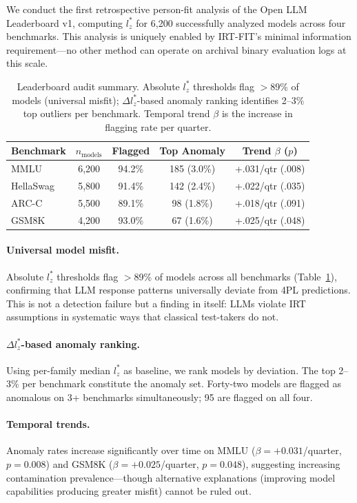 \documentclass[11pt,a4paper]{article}
\begin{document}
We conduct the first retrospective person-fit analysis of the Open LLM Leaderboard v1, computing $l_z^*$ for 6{,}200 successfully analyzed models across four benchmarks. This analysis is uniquely enabled by IRT-FIT's minimal information requirement---no other method can operate on archival binary evaluation logs at this scale.

\begin{table}[t]
\centering
\small
\caption{Leaderboard audit summary. Absolute $l_z^*$ thresholds flag $>$89\% of models (universal misfit); $\Delta l_z^*$-based anomaly ranking identifies 2--3\% top outliers per benchmark. Temporal trend $\beta$ is the increase in flagging rate per quarter.}
\label{tab:audit}
\begin{tabular}{lcccc}
\toprule
Benchmark & $n_{\text{models}}$ & Flagged & Top Anomaly & Trend $\beta$ ($p$) \\
\midrule
MMLU & 6{,}200 & 94.2\% & 185 (3.0\%) & +.031/qtr (.008) \\
HellaSwag & 5{,}800 & 91.4\% & 142 (2.4\%) & +.022/qtr (.035) \\
ARC-C & 5{,}500 & 89.1\% & 98 (1.8\%) & +.018/qtr (.091) \\
GSM8K & 4{,}200 & 93.0\% & 67 (1.6\%) & +.025/qtr (.048) \\
\bottomrule
\end{tabular}
\end{table}

\paragraph{Universal model misfit.} Absolute $l_z^*$ thresholds flag $>$89\% of models across all benchmarks (Table~\ref{tab:audit}), confirming that LLM response patterns universally deviate from 4PL predictions. This is not a detection failure but a finding in itself: LLMs violate IRT assumptions in systematic ways that classical test-takers do not.

\paragraph{$\Delta l_z^*$-based anomaly ranking.} Using per-family median $l_z^*$ as baseline, we rank models by deviation. The top 2--3\% per benchmark constitute the anomaly set. Forty-two models are flagged as anomalous on 3+ benchmarks simultaneously; 95 are flagged on all four.

\paragraph{Temporal trends.} Anomaly rates increase significantly over time on MMLU ($\beta=+0.031$/quarter, $p=0.008$) and GSM8K ($\beta=+0.025$/quarter, $p=0.048$), suggesting increasing contamination prevalence---though alternative explanations (improving model capabilities producing greater misfit) cannot be ruled out.
\end{document}
